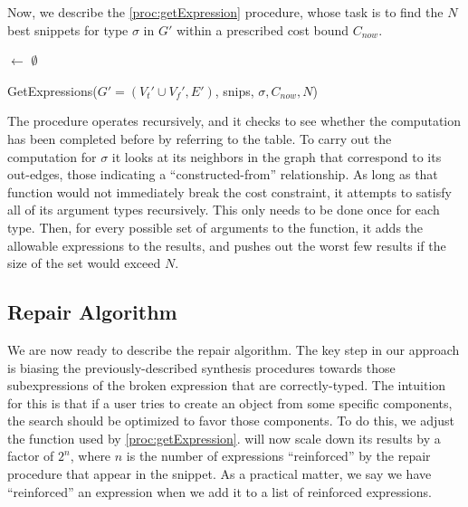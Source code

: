 Now, we describe the \ref{proc:getExpression} procedure, whose task is
to find the $N$ best snippets for type $\sigma$ in $G'$ within a
prescribed cost bound $C_{now}$.
\begin{procedure}
\lIf{$\sigma$ $\in$ \Keys{\Snips}}{\Return{\Snips$[\sigma]$}}
\Results $\leftarrow$ $\emptyset$ \;
\Return{\Results}
\caption{GetExpressions({$G'=(V_t' \cup V_f', E')$}, snips, $\sigma, C_{now}, N$)}\label{proc:getExpression}
\end{procedure}
The procedure operates recursively, and it checks to see whether the
computation has been completed before by referring to the \Snips
table. To carry out the computation for $\sigma$ it looks at its
neighbors in the graph that correspond to its out-edges, those
indicating a ``constructed-from'' relationship. As long as that
function would not immediately break the cost constraint, it attempts
to satisfy all of its argument types recursively. This only needs to
be done once for each type. Then, for every possible set of arguments
to the function, it adds the allowable expressions to the results, and
pushes out the worst few results if the size of the set would exceed
$N$.

\subsection{Repair Algorithm}
\label{sec:algorithm:repair}
We are now ready to describe the repair algorithm. The key step in our
approach is biasing the previously-described synthesis procedures
towards those subexpressions of the broken expression that are
correctly-typed. The intuition for this is that if a user tries to
create an object from some specific components, the search should be
optimized to favor those components. To do this, we adjust the \Cost
function used by \ref{proc:getExpression}. \Cost will now scale down
its results by a factor of $2^n$, where $n$ is the number of
expressions ``reinforced'' by the repair procedure that appear in the
snippet. As a practical matter, we say we have ``reinforced'' an
expression when we add it to a list of reinforced expressions.


